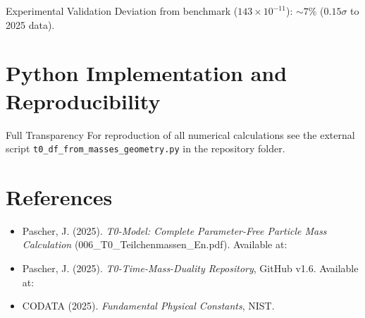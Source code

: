 	\begin{result}{Experimental Validation}{}
		Deviation from benchmark ($143 \times 10^{-11}$): $\sim 7\%$ ($0.15\sigma$ to 2025 data).
	\end{result}
	
	\section{Python Implementation and Reproducibility}
	\label{sec:python_implementation}
	
	\begin{important}{Full Transparency}{}
		For reproduction of all numerical calculations see the external script \texttt{t0\_df\_from\_masses\_geometry.py} in the repository folder.
	\end{important}
	
	\section{References}
	\label{sec:references}
	
	\begin{itemize}
		\item Pascher, J. (2025). \emph{T0-Model: Complete Parameter-Free Particle Mass Calculation} (006\_T0\_Teilchenmassen\_En.pdf). Available at: 
		
		\item Pascher, J. (2025). \emph{T0-Time-Mass-Duality Repository}, GitHub v1.6. Available at: 
		
		\item CODATA (2025). \emph{Fundamental Physical Constants}, NIST.
	\end{itemize}
